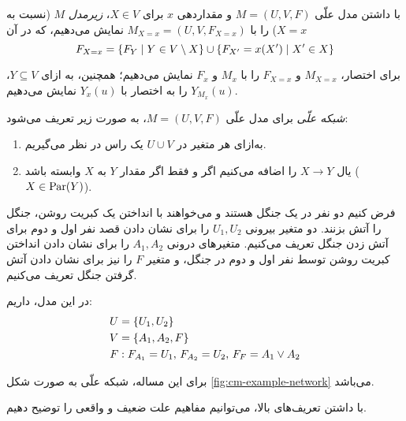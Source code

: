 \begin{definition}\label{def:causal-submodel}
  با داشتن مدل علّی
  $M=(U,V,F)$
  و مقداردهی
  $x$
  برای
  $X \in V$،
  \textit{زیرمدل} $M$
  (نسبت به
  $X=x$)
  را با
  $M_{X=x} = (U, V, F_{X=x})$
  نمایش می‌دهیم، که در آن
  \begin{equation*}
    F_{X=x} =
      \left\{ F_Y \mid Y \in V \setminus X \right\} \cup
      \left\{ F_{X'} = x(X') \mid X' \in X \right\}
  \end{equation*}
\end{definition}

برای اختصار،
$M_{X=x}$ و $F_{X=x}$
را با
$M_x$ و $F_x$
نمایش می‌دهیم؛ همچنین،
به ازای
$Y \subseteq V$،
$Y_{M_x}(u)$
را به اختصار با
$Y_x(u)$
نمایش می‌دهیم.

\begin{definition}\label{def:causal-network}
  \textit{شبکه علّی}
  برای مدل علّی
  $M=(U,V,F)$،
  به صورت زیر تعریف می‌شود:
  \begin{enumerate}[label=(\alph*)]
    \item به‌ازای هر متغیر در
    $U \cup V$
    یک راس در نظر می‌گیریم.
    \item یال
    $X \to Y$
    را اضافه می‌کنیم اگر و فقط اگر
    مقدار
    $Y$
    به
    $X$
    وابسته باشد
    ($X \in \operatorname{Par}(Y)$).
  \end{enumerate}
\end{definition}

\begin{example}\label{ex:causal-model}
  فرض کنیم دو نفر در یک جنگل هستند
  و می‌خواهند با انداختن یک کبریت روشن،
  جنگل را آتش بزنند.
  دو متغیر بیرونی
  $U_1,U_2$
  را برای نشان دادن قصد نفر اول و دوم
  برای آتش زدن جنگل تعریف می‌کنیم.
  متغیرهای درونی
  $A_1,A_2$
  را برای نشان دادن انداختن کبریت روشن
  توسط نفر اول و دوم در جنگل،
  و متغیر
  $F$
  را نیز برای نشان دادن آتش گرفتن جنگل تعریف می‌کنیم. 

  در این مدل، داریم:
  \begin{align*}
    U & = \left\{ U_1,U_2 \right\} \\
    V & = \left\{ A_1,A_2,F \right\} \\
    F & :
      F_{A_1}=U_1,\,
      F_{A_2}=U_2,\,
      F_{F}=A_1 \vee A_2
  \end{align*}

  برای این مساله، شبکه علّی به صورت شکل
  \ref{fig:cm-example-network}
  می‌باشد.

  
\end{example}

با داشتن تعریف‌های بالا،
می‌توانیم مفاهیم علت ضعیف و واقعی را توضیح دهیم.

